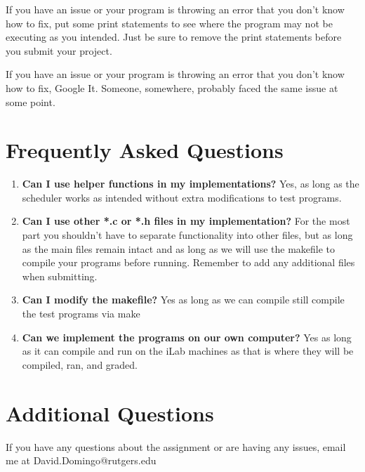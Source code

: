 \documentclass{article}
\begin{document}
\begin{info}
If you have an issue or your program is throwing an error that you don’t know how to fix, put some print statements to see where the program may not be executing as you intended. Just be sure to remove the print statements before you submit your project.
\end{info}

\begin{info}
If you have an issue or your program is throwing an error that you don't know how to fix, Google It. Someone, somewhere, probably faced the same issue at some point.
\end{info}

\section*{Frequently Asked Questions}
\begin{enumerate}
\item \textbf{Can I use helper functions in my implementations?} Yes, as long as the scheduler works as intended
without extra modifications to test programs.
\item \textbf{Can I use other *.c or *.h files in my implementation?} For the most part you shouldn’t have to separate functionality into other files, but as long as the main files remain intact and as long as we will use the makefile to compile your programs before running. Remember to add any additional files when submitting. 
\item \textbf{Can I modify the makefile?} Yes as long as we can compile still compile the test programs via make
\item \textbf{Can we implement the programs on our own computer?} Yes as long as it can compile and run on
the iLab machines as that is where they will be compiled, ran, and graded.
\end{enumerate}

\section*{Additional Questions}
If you have any questions about the assignment or are having any issues, email me at David.Domingo@rutgers.edu
\end{document}
